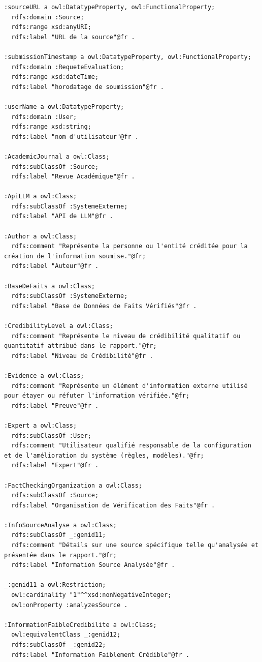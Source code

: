 \documentclass[9pt,twocolumn,twoside,french]{article}
\begin{document}
\begin{lstlisting}[language=Turtle,basicstyle=\ttfamily\tiny,frame=single]
:sourceURL a owl:DatatypeProperty, owl:FunctionalProperty;
  rdfs:domain :Source;
  rdfs:range xsd:anyURI;
  rdfs:label "URL de la source"@fr .

:submissionTimestamp a owl:DatatypeProperty, owl:FunctionalProperty;
  rdfs:domain :RequeteEvaluation;
  rdfs:range xsd:dateTime;
  rdfs:label "horodatage de soumission"@fr .

:userName a owl:DatatypeProperty;
  rdfs:domain :User;
  rdfs:range xsd:string;
  rdfs:label "nom d'utilisateur"@fr .

:AcademicJournal a owl:Class;
  rdfs:subClassOf :Source;
  rdfs:label "Revue Académique"@fr .

:ApiLLM a owl:Class;
  rdfs:subClassOf :SystemeExterne;
  rdfs:label "API de LLM"@fr .

:Author a owl:Class;
  rdfs:comment "Représente la personne ou l'entité créditée pour la création de l'information soumise."@fr;
  rdfs:label "Auteur"@fr .

:BaseDeFaits a owl:Class;
  rdfs:subClassOf :SystemeExterne;
  rdfs:label "Base de Données de Faits Vérifiés"@fr .

:CredibilityLevel a owl:Class;
  rdfs:comment "Représente le niveau de crédibilité qualitatif ou quantitatif attribué dans le rapport."@fr;
  rdfs:label "Niveau de Crédibilité"@fr .

:Evidence a owl:Class;
  rdfs:comment "Représente un élément d'information externe utilisé pour étayer ou réfuter l'information vérifiée."@fr;
  rdfs:label "Preuve"@fr .

:Expert a owl:Class;
  rdfs:subClassOf :User;
  rdfs:comment "Utilisateur qualifié responsable de la configuration et de l'amélioration du système (règles, modèles)."@fr;
  rdfs:label "Expert"@fr .

:FactCheckingOrganization a owl:Class;
  rdfs:subClassOf :Source;
  rdfs:label "Organisation de Vérification des Faits"@fr .

:InfoSourceAnalyse a owl:Class;
  rdfs:subClassOf _:genid11;
  rdfs:comment "Détails sur une source spécifique telle qu'analysée et présentée dans le rapport."@fr;
  rdfs:label "Information Source Analysée"@fr .

_:genid11 a owl:Restriction;
  owl:cardinality "1"^^xsd:nonNegativeInteger;
  owl:onProperty :analyzesSource .

:InformationFaibleCredibilite a owl:Class;
  owl:equivalentClass _:genid12;
  rdfs:subClassOf _:genid22;
  rdfs:label "Information Faiblement Crédible"@fr .


\end{lstlisting}
\end{document}
